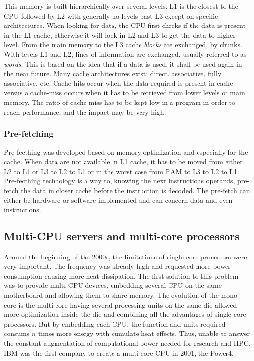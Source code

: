 This memory is built hierarchically over several levels. 
L1 is the closest to the CPU followed by L2 with generally no levels past L3 except on specific architectures. 
When looking for data, the CPU first checks if the data is present in the L1 cache, otherwise it will look in L2 and L3 to get the data to higher level. 
From the main memory to the L3 cache \textit{blocks} are exchanged, by chunks. 
With levels L1 and L2, lines of information are exchanged, usually referred to as \textit{words}.
This is based on the idea that if a data is used, it shall be used again in the near future.
Many cache architectures exist: direct, associative, fully associative, etc. 
Cache-hits occur when the data required is present in cache versus a cache-miss occurs when it has to be retrieved from lower levels or main memory. 
The ratio of cache-miss has to be kept low in a program in order to reach performance, and the impact may be very high.

\subsubsection{Pre-fetching} 
Pre-fecthing was developed based on memory optimization and especially for the cache.
When data are not available in L1 cache, it has to be moved from either L2 to L1 or L3 to L2 to L1 or in the worst case from RAM to L3 to L2 to L1. 
Pre-fecthing technology is a way to, knowing the next instructions operands, pre-fetch the data in closer cache before the instruction is decoded. 
The pre-fetch can either be hardware or software implemented and can concern data and even instructions.

\subsection{Multi-CPU servers and multi-core processors}
Around the beginning of the 2000s, the limitations of single core processors were very important. 
The frequency was already high and requested more power consumption causing more heat dissipation. 
The first solution to this problem was to provide multi-CPU devices, embedding several CPU on the same motherboard and allowing them to share memory. 
The evolution of the mono-core is the multi-core having several processing units on the same die allowed more optimization inside the die and combining all the advantages of single core processors.
But by embedding each CPU, the function and units required consume $n$ times more energy with cumulate heat effects.
Thus, unable to answer the constant augmentation of computational power needed for research and HPC, IBM was the first company to create a multi-core CPU in 2001, the Power4. 

